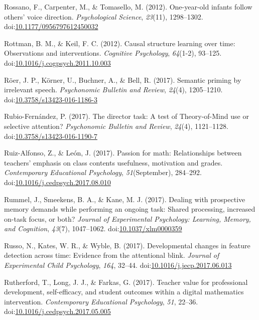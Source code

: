 \documentclass[english,man]{apa6}
\theoremstyle{definition}
\theoremstyle{definition}
\theoremstyle{definition}
\theoremstyle{remark}
\begin{document}
\hypertarget{ref-Rossano2012}{}
Rossano, F., Carpenter, M., \& Tomasello, M. (2012). One-year-old
infants follow others' voice direction. \emph{Psychological Science},
\emph{23}(11), 1298--1302.
doi:\href{https://doi.org/10.1177/0956797612450032}{10.1177/0956797612450032}

\hypertarget{ref-Rottman2012}{}
Rottman, B. M., \& Keil, F. C. (2012). Causal structure learning over
time: Observations and interventions. \emph{Cognitive Psychology},
\emph{64}(1-2), 93--125.
doi:\href{https://doi.org/10.1016/j.cogpsych.2011.10.003}{10.1016/j.cogpsych.2011.10.003}

\hypertarget{ref-Roer2016}{}
Röer, J. P., Körner, U., Buchner, A., \& Bell, R. (2017). Semantic
priming by irrelevant speech. \emph{Psychonomic Bulletin and Review},
\emph{24}(4), 1205--1210.
doi:\href{https://doi.org/10.3758/s13423-016-1186-3}{10.3758/s13423-016-1186-3}

\hypertarget{ref-Rubio-Fernandez2016}{}
Rubio-Fernández, P. (2017). The director task: A test of Theory-of-Mind
use or selective attention? \emph{Psychonomic Bulletin and Review},
\emph{24}(4), 1121--1128.
doi:\href{https://doi.org/10.3758/s13423-016-1190-7}{10.3758/s13423-016-1190-7}

\hypertarget{ref-Ruiz-Alfonso2017}{}
Ruiz-Alfonso, Z., \& León, J. (2017). Passion for math: Relationships
between teachers' emphasis on class contents usefulness, motivation and
grades. \emph{Contemporary Educational Psychology},
\emph{51}(September), 284--292.
doi:\href{https://doi.org/10.1016/j.cedpsych.2017.08.010}{10.1016/j.cedpsych.2017.08.010}

\hypertarget{ref-Rummel2017}{}
Rummel, J., Smeekens, B. A., \& Kane, M. J. (2017). Dealing with
prospective memory demands while performing an ongoing task: Shared
processing, increased on-task focus, or both? \emph{Journal of
Experimental Psychology: Learning, Memory, and Cognition}, \emph{43}(7),
1047--1062.
doi:\href{https://doi.org/10.1037/xlm0000359}{10.1037/xlm0000359}

\hypertarget{ref-Russo2017}{}
Russo, N., Kates, W. R., \& Wyble, B. (2017). Developmental changes in
feature detection across time: Evidence from the attentional blink.
\emph{Journal of Experimental Child Psychology}, \emph{164}, 32--44.
doi:\href{https://doi.org/10.1016/j.jecp.2017.06.013}{10.1016/j.jecp.2017.06.013}

\hypertarget{ref-Rutherford2017}{}
Rutherford, T., Long, J. J., \& Farkas, G. (2017). Teacher value for
professional development, self-efficacy, and student outcomes within a
digital mathematics intervention. \emph{Contemporary Educational
Psychology}, \emph{51}, 22--36.
doi:\href{https://doi.org/10.1016/j.cedpsych.2017.05.005}{10.1016/j.cedpsych.2017.05.005}
\end{document}
